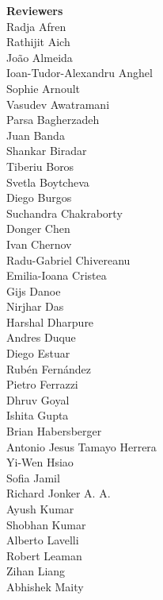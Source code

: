 \documentclass[11pt,oneside]{book}
\begin{document}
\begin{description}
  \item{\bf Reviewers}\vspace{2mm}\\
            Radja Afren\\
          Rathijit Aich\\
          João Almeida\\
          Ioan-Tudor-Alexandru Anghel\\
          Sophie Arnoult\\
          Vasudev Awatramani\\
          Parsa Bagherzadeh\\
          Juan Banda\\
          Shankar Biradar\\
          Tiberiu Boros\\
          Svetla Boytcheva\\
          Diego Burgos\\
          Suchandra Chakraborty\\
          Donger Chen\\
          Ivan Chernov\\
          Radu-Gabriel Chivereanu\\
          Emilia-Ioana Cristea\\
          Gijs Danoe\\
          Nirjhar Das\\
          Harshal Dharpure\\
          Andres Duque\\
          Diego Estuar\\
          Rubén Fernández\\
          Pietro Ferrazzi\\
          Dhruv Goyal\\
          Ishita Gupta\\
          Brian Habersberger\\
          Antonio Jesus Tamayo Herrera\\
          Yi-Wen Hsiao\\
          Sofia Jamil\\
          Richard Jonker A. A.\\
          Ayush Kumar\\
          Shobhan Kumar\\
          Alberto Lavelli\\
          Robert Leaman\\
          Zihan Liang\\
          Abhishek Maity\\

\end{description}
\end{document}
